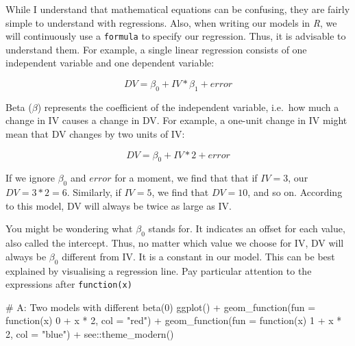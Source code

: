 \documentclass[
  letterpaper,
]{krantz}
\makeatletter
\newenvironment{Shaded}{\begin{snugshade}}{\end{snugshade}}
\newcommand{\AttributeTok}[1]{\textcolor[rgb]{0.40,0.45,0.13}{#1}}
\newcommand{\CommentTok}[1]{\textcolor[rgb]{0.37,0.37,0.37}{#1}}
\newcommand{\ControlFlowTok}[1]{\textcolor[rgb]{0.00,0.23,0.31}{#1}}
\newcommand{\DecValTok}[1]{\textcolor[rgb]{0.68,0.00,0.00}{#1}}
\newcommand{\FunctionTok}[1]{\textcolor[rgb]{0.28,0.35,0.67}{#1}}
\newcommand{\NormalTok}[1]{\textcolor[rgb]{0.00,0.23,0.31}{#1}}
\newcommand{\SpecialCharTok}[1]{\textcolor[rgb]{0.37,0.37,0.37}{#1}}
\newcommand{\StringTok}[1]{\textcolor[rgb]{0.13,0.47,0.30}{#1}}
\newenvironment{kframe}{%
\medskip{}
\setlength{\fboxsep}{.8em}
 \def\at@end@of@kframe{}%
 \ifinner\ifhmode%
  \def\at@end@of@kframe{\end{minipage}}%
  \begin{minipage}{\columnwidth}%
 \fi\fi%
 \def\FrameCommand##1{\hskip\@totalleftmargin \hskip-\fboxsep
 \colorbox{shadecolor}{##1}\hskip-\fboxsep
     \hskip-\linewidth \hskip-\@totalleftmargin \hskip\columnwidth}%
 \MakeFramed {\advance\hsize-\width
   \@totalleftmargin\z@ \linewidth\hsize
   \@setminipage}}%
 {\par\unskip\endMakeFramed%
 \at@end@of@kframe}
\renewenvironment{Shaded}{\begin{kframe}}{\end{kframe}}
\makeatother
\begin{document}
While I understand that mathematical equations can be confusing, they
are fairly simple to understand with regressions. Also, when writing our
models in \emph{R}, we will continuously use a \texttt{formula} to
specify our regression. Thus, it is advisable to understand them. For
example, a single linear regression consists of one independent variable
and one dependent variable:

\[
DV = \beta_{0} + IV * \beta_{1} + error
\]

Beta (\(\beta\)) represents the coefficient of the independent variable,
i.e.~how much a change in IV causes a change in DV. For example, a
one-unit change in IV might mean that DV changes by two units of IV:

\label{single-linear-regression-example}
\[
DV = \beta_0 + IV * 2 + error
\]

If we ignore \(\beta_0\) and \(error\) for a moment, we find that that
if \(IV = 3\), our \(DV = 3*2 = 6\). Similarly, if \(IV = 5\), we find
that \(DV = 10\), and so on. According to this model, DV will always be
twice as large as IV.

You might be wondering what \(\beta_0\) stands for. It indicates an
offset for each value, also called the intercept. Thus, no matter which
value we choose for IV, DV will always be \(\beta_0\) different from IV.
It is a constant in our model. This can be best explained by visualising
a regression line. Pay particular attention to the expressions after
\texttt{function(x)}

\begin{Shaded}
\begin{Highlighting}[]
\CommentTok{\# A: Two models with different beta(0)}
\FunctionTok{ggplot}\NormalTok{() }\SpecialCharTok{+}
  \FunctionTok{geom\_function}\NormalTok{(}\AttributeTok{fun =} \ControlFlowTok{function}\NormalTok{(x) }\DecValTok{0} \SpecialCharTok{+}\NormalTok{ x }\SpecialCharTok{*} \DecValTok{2}\NormalTok{, }\AttributeTok{col =} \StringTok{"red"}\NormalTok{) }\SpecialCharTok{+}
  \FunctionTok{geom\_function}\NormalTok{(}\AttributeTok{fun =} \ControlFlowTok{function}\NormalTok{(x) }\DecValTok{1} \SpecialCharTok{+}\NormalTok{ x }\SpecialCharTok{*} \DecValTok{2}\NormalTok{, }\AttributeTok{col =} \StringTok{"blue"}\NormalTok{) }\SpecialCharTok{+}
\NormalTok{  see}\SpecialCharTok{::}\FunctionTok{theme\_modern}\NormalTok{()  }
\end{Highlighting}
\end{Shaded}
\end{document}
